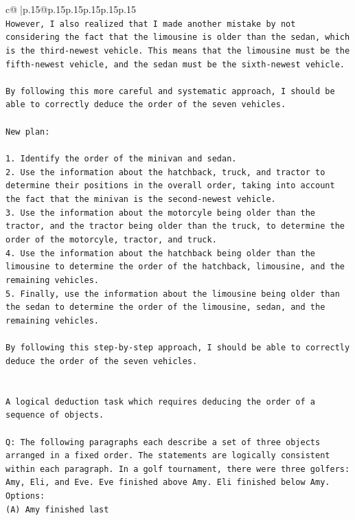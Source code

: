 \documentclass{article}
\begin{document}
{\begin{supertabular}{c@{$\;$}|p{.15\linewidth}@{}p{.15\linewidth}p{.15\linewidth}p{.15\linewidth}p{.15\linewidth}p{.15\linewidth}}
{{{\\ 
\texttt{However, I also realized that I made another mistake by not considering the fact that the limousine is older than the sedan, which is the third{-}newest vehicle. This means that the limousine must be the fifth{-}newest vehicle, and the sedan must be the sixth{-}newest vehicle.} \\
\\ 
\texttt{By following this more careful and systematic approach, I should be able to correctly deduce the order of the seven vehicles.} \\
\\ 
\texttt{New plan: } \\
\\ 
\texttt{1. Identify the order of the minivan and sedan.} \\
\texttt{2. Use the information about the hatchback, truck, and tractor to determine their positions in the overall order, taking into account the fact that the minivan is the second{-}newest vehicle.} \\
\texttt{3. Use the information about the motorcyle being older than the tractor, and the tractor being older than the truck, to determine the order of the motorcyle, tractor, and truck.} \\
\texttt{4. Use the information about the hatchback being older than the limousine to determine the order of the hatchback, limousine, and the remaining vehicles.} \\
\texttt{5. Finally, use the information about the limousine being older than the sedan to determine the order of the limousine, sedan, and the remaining vehicles.} \\
\\ 
\texttt{By following this step{-}by{-}step approach, I should be able to correctly deduce the order of the seven vehicles.} \\
\\ 
\\ 
\texttt{A logical deduction task which requires deducing the order of a sequence of objects.} \\
\\ 
\texttt{Q: The following paragraphs each describe a set of three objects arranged in a fixed order. The statements are logically consistent within each paragraph. In a golf tournament, there were three golfers: Amy, Eli, and Eve. Eve finished above Amy. Eli finished below Amy.} \\
\texttt{Options:} \\
\texttt{(A) Amy finished last} \\
}}}
\end{supertabular}}
\end{document}
